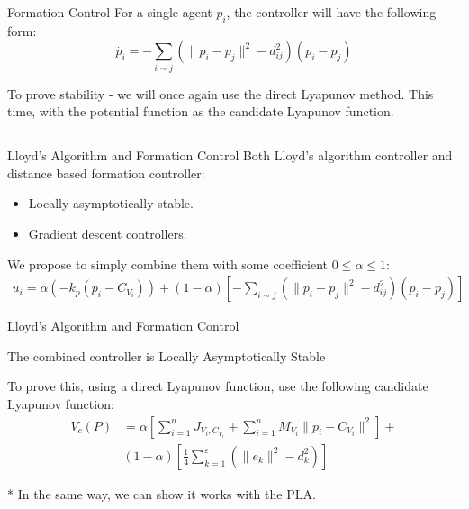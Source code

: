 \documentclass[t]{beamer}
\newcommand{\norm}[1]{\lVert #1 \rVert}
\begin{document}
\begin{frame}[label=distanceformation3]{Formation Control}
For a single agent $p_i$, the controller will have the following form:
\begin{equation*}
    \dot{p_{i}} = -\sum_{i \sim j} \left( \norm{p_{i} - p_{j}}^{2} - d_{ij}^2 \right) \left( p_{i} - p_{j} \right)
    \label{formation controller}
\end{equation*}

To prove stability - we will once again use the direct Lyapunov method. This time, with the potential function as the candidate Lyapunov function.

\end{frame}

\subsection[Lloyd's Algorithm and Formation Control]{}
\begin{frame}[label=lloydsandformation1]{Lloyd's Algorithm and Formation Control}
Both Lloyd's algorithm controller and distance based formation controller:
\begin{itemize}
\item Locally asymptotically stable.
\item Gradient descent controllers.
\end{itemize} 
We propose to simply combine them with some coefficient $0 \leq \alpha \leq 1$:
\begin{align}
    u_{i} = \alpha \left(-k_{p}\left( p_i -C_{V_{i}} \right)\right) +
    \left( 1-\alpha \right)\left[-\sum_{i \sim j} \left( \norm{p_{i} - p_{j}}^{2} - d_{ij}^2 \right) \left( p_{i} - p_{j} \right)  \right] 
    \label{Combined Controller}
\end{align}
\end{frame}
\begin{frame}[label=lloydsandformation2]{Lloyd's Algorithm and Formation Control}
\begin{theorem}
The combined controller is Locally Asymptotically Stable
\end{theorem}

To prove this, using a direct Lyapunov function, use the following candidate Lyapunov function:
\begin{align*}
        V_{c}\left(P\right) &= \alpha\left[ \sum_{i=1}^{n} J_{V_i,C_{V_i}} + \sum_{i=1}^{n} M_{V_i} \norm{p_i - C_{V_i}}^2 \right] +\\
        &(1-\alpha) \left[ \frac{1}{4}\sum_{k=1}^{\varepsilon}\left( \norm{e_k}^2 - d_{k}^{2} \right) \right]
\end{align*}

* In the same way, we can show it works with the PLA.
\end{frame}
\end{document}
